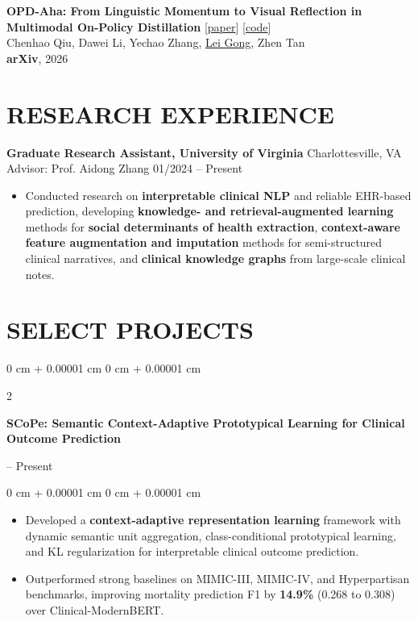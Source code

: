 \documentclass[10pt, letterpaper]{article}
\newenvironment{highlights}{
    \begin{itemize}[
        topsep=0.10 cm,
        parsep=0.10 cm,
        partopsep=0pt,
        itemsep=0pt,
        leftmargin=0 cm + 10pt
    ]
}{
    \end{itemize}
} %
\newenvironment{onecolentry}{
    \begin{adjustwidth}{
        0 cm + 0.00001 cm
    }{
        0 cm + 0.00001 cm
    }
}{
    \end{adjustwidth}
} %
\newenvironment{twocolentry}[2][]{
    \onecolentry
    \def\secondColumn{#2}
    \setcolumnwidth{\fill, 4.5 cm}
    \begin{paracol}{2}
}{
    \switchcolumn \raggedleft \secondColumn
    \end{paracol}
    \endonecolentry
} %
\begin{document}
\begin{enumerate}[label={[\arabic*]}]
            \item \textbf{OPD-Aha: From Linguistic Momentum to Visual Reflection in Multimodal On-Policy Distillation} [\href{https://arxiv.org/abs/2609.16459}{paper}] [\href{https://github.com/Echochef/OPD-Aha}{code}] \\
            Chenhao Qiu, Dawei Li, Yechao Zhang, \underline{Lei Gong}, Zhen Tan\\
            \textbf{arXiv}, 2026
                    
        \end{enumerate}

        \section{RESEARCH EXPERIENCE}
        \textbf{Graduate Research Assistant, University of Virginia} \hfill Charlottesville, VA \\
Advisor: Prof. Aidong Zhang \hfill 01/2024 -- Present
\begin{itemize}
    \item Conducted research on \textbf{interpretable clinical NLP} and reliable EHR-based prediction, developing \textbf{knowledge- and retrieval-augmented learning} methods for \textbf{social determinants of health extraction}, \textbf{context-aware feature augmentation and imputation} methods for semi-structured clinical narratives, and \textbf{clinical knowledge graphs} from large-scale clinical notes.
\end{itemize}
        
\section{SELECT PROJECTS}


\begin{twocolentry}{
    2026 -- Present
}
    \textbf{SCoPe: Semantic Context-Adaptive Prototypical Learning for Clinical Outcome Prediction}
\end{twocolentry}

\vspace{0.05 cm}
\begin{onecolentry}
    \begin{highlights}
        \item Developed a \textbf{context-adaptive representation learning} framework with dynamic semantic unit aggregation, class-conditional prototypical learning, and KL regularization for interpretable clinical outcome prediction.

        \item Outperformed strong baselines on MIMIC-III, MIMIC-IV, and Hyperpartisan benchmarks, improving mortality prediction F1 by \textbf{14.9\%} (0.268 to 0.308) over Clinical-ModernBERT.
    \end{highlights}
\end{onecolentry}
\end{document}
